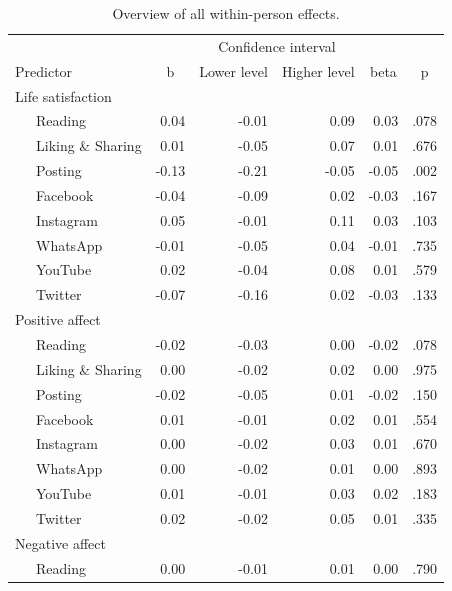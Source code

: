 \documentclass[
  man,mask]{apa7}
\begin{document}
\begin{table}[tbp]

\begin{center}
\begin{threeparttable}

\caption{\label{tab:tab-within}Overview of all within-person effects.}

\footnotesize{

\begin{tabular}{lrrrrr}
\toprule
 &  & \multicolumn{2}{c}{Confidence interval}  &  &\\
\cmidrule(r){3-4}
Predictor & \multicolumn{1}{c}{b} & \multicolumn{1}{c}{Lower level} & \multicolumn{1}{c}{Higher level} & \multicolumn{1}{c}{beta} & \multicolumn{1}{c}{p}\\
\midrule
Life satisfaction &  &  &  &  & \\
\ \ \ Reading & 0.04 & -0.01 & 0.09 & 0.03 & .078\\
\ \ \ Liking \& Sharing & 0.01 & -0.05 & 0.07 & 0.01 & .676\\
\ \ \ Posting & -0.13 & -0.21 & -0.05 & -0.05 & .002\\
\ \ \ Facebook & -0.04 & -0.09 & 0.02 & -0.03 & .167\\
\ \ \ Instagram & 0.05 & -0.01 & 0.11 & 0.03 & .103\\
\ \ \ WhatsApp & -0.01 & -0.05 & 0.04 & -0.01 & .735\\
\ \ \ YouTube & 0.02 & -0.04 & 0.08 & 0.01 & .579\\
\ \ \ Twitter & -0.07 & -0.16 & 0.02 & -0.03 & .133\\
Positive affect &  &  &  &  & \\
\ \ \ Reading & -0.02 & -0.03 & 0.00 & -0.02 & .078\\
\ \ \ Liking \& Sharing & 0.00 & -0.02 & 0.02 & 0.00 & .975\\
\ \ \ Posting & -0.02 & -0.05 & 0.01 & -0.02 & .150\\
\ \ \ Facebook & 0.01 & -0.01 & 0.02 & 0.01 & .554\\
\ \ \ Instagram & 0.00 & -0.02 & 0.03 & 0.01 & .670\\
\ \ \ WhatsApp & 0.00 & -0.02 & 0.01 & 0.00 & .893\\
\ \ \ YouTube & 0.01 & -0.01 & 0.03 & 0.02 & .183\\
\ \ \ Twitter & 0.02 & -0.02 & 0.05 & 0.01 & .335\\
Negative affect &  &  &  &  & \\
\ \ \ Reading & 0.00 & -0.01 & 0.01 & 0.00 & .790\\

\end{tabular}}
\end{threeparttable}
\end{center}
\end{table}
\end{document}
